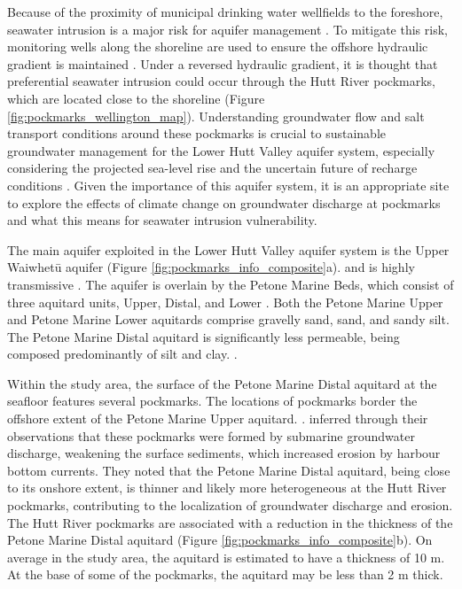 \documentclass[draft, 10pt]{agujournal2019}
\begin{document}
Because of the proximity of municipal drinking water wellfields to the foreshore, seawater intrusion is a major risk for aquifer management \cite{bennett_hutt_2024}. To mitigate this risk, monitoring wells along the shoreline are used to ensure the offshore hydraulic gradient is maintained \cite{gyopari_lower_2014}. Under a reversed hydraulic gradient, it is thought that preferential seawater intrusion could occur through the Hutt River pockmarks, which are located close to the shoreline (Figure \ref{fig:pockmarks_wellington_map}). Understanding groundwater flow and salt transport conditions around these pockmarks is crucial to sustainable groundwater management for the Lower Hutt Valley aquifer system, especially considering the projected sea-level rise and the uncertain future of recharge conditions \cite{michael_science_2017, bennett_hutt_2024}. Given the importance of this aquifer system, it is an appropriate site to explore the effects of climate change on groundwater discharge at pockmarks and what this means for seawater intrusion vulnerability.

The main aquifer exploited in the Lower Hutt Valley aquifer system is the Upper Waiwhetū aquifer (Figure \ref{fig:pockmarks_info_composite}a). 
  and is highly transmissive \cite{bennett_hutt_2024, gyopari_lower_2014, shulmeister_timing_2019}.  
The aquifer is overlain by the Petone Marine Beds, which consist of three aquitard units, Upper, Distal, and Lower \cite{begg_revised_2023}. Both the Petone Marine Upper and Petone Marine Lower aquitards comprise gravelly sand, sand, and sandy silt. The Petone Marine Distal aquitard is significantly less permeable, being composed predominantly of silt and clay. 
 \cite{gyopari_lower_2014}.

Within the study area, the surface of the Petone Marine Distal aquitard at the seafloor features several pockmarks. The locations of pockmarks border the offshore extent of the Petone Marine Upper aquitard. 
 \cite{harding_characteristics_2000, hoffmann_fresh_2023}. %
 inferred through their observations that these pockmarks were formed by submarine groundwater discharge, weakening the surface sediments, which increased erosion by harbour bottom currents. They noted that the Petone Marine Distal aquitard, being close to its onshore extent, is thinner and likely more heterogeneous at the Hutt River pockmarks, contributing to the localization of groundwater discharge and erosion. The Hutt River pockmarks are associated with a reduction in the thickness of the Petone Marine Distal aquitard (Figure \ref{fig:pockmarks_info_composite}b). On average in the study area, the aquitard is estimated to have a thickness of 10 m. At the base of some of the pockmarks, the aquitard may be less than 2 m thick.
\end{document}
